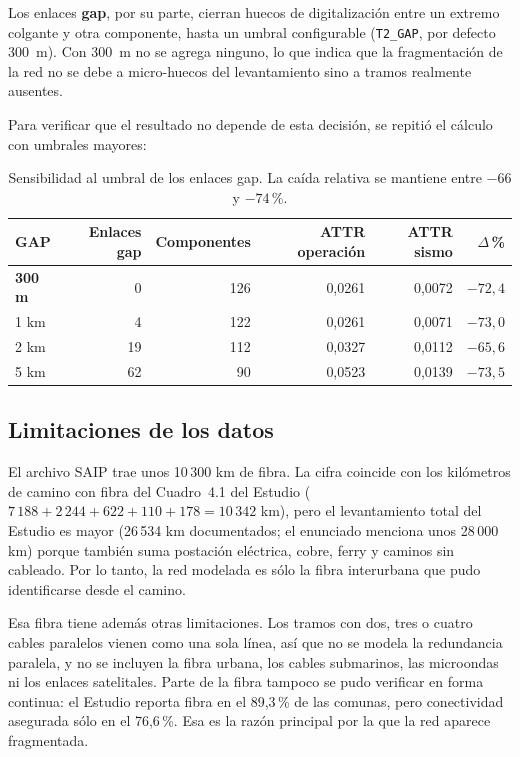 \documentclass[11pt,a4paper]{article}
\newcommand{\cod}[1]{\texttt{#1}}
\begin{document}
Los enlaces \textbf{gap}, por su parte, cierran huecos de digitalización entre un extremo colgante y
otra componente, hasta un umbral configurable (\cod{T2\_GAP}, por defecto 300~m). Con 300~m no se
agrega ninguno, lo que indica que la fragmentación de la red no se debe a micro-huecos del
levantamiento sino a tramos realmente ausentes.

Para verificar que el resultado no depende de esta decisión, se repitió el cálculo con umbrales mayores:

\begin{table}[h]
\centering
\begin{tabular}{lrrrrr}
\toprule
GAP & Enlaces gap & Componentes & ATTR operación & ATTR sismo & $\Delta$\,\% \\
\midrule
\textbf{300 m} & 0 & 126 & 0,0261 & 0,0072 & $-72{,}4$ \\
1 km & 4 & 122 & 0,0261 & 0,0071 & $-73{,}0$ \\
2 km & 19 & 112 & 0,0327 & 0,0112 & $-65{,}6$ \\
5 km & 62 & 90 & 0,0523 & 0,0139 & $-73{,}5$ \\
\bottomrule
\end{tabular}
\caption{Sensibilidad al umbral de los enlaces gap. La caída relativa se mantiene entre $-66$ y $-74$\,\%.}
\end{table}

\subsection{Limitaciones de los datos}
El archivo SAIP trae unos 10\,300 km de fibra. La cifra coincide con los kilómetros de camino con
fibra del Cuadro~4.1 del Estudio ($7\,188 + 2\,244 + 622 + 110 + 178 = 10\,342$ km), pero el
levantamiento total del Estudio es mayor (26\,534 km documentados; el enunciado menciona unos
28\,000 km) porque también suma postación eléctrica, cobre, ferry y caminos sin cableado. Por lo tanto,
la red modelada es sólo la fibra interurbana que pudo identificarse desde el camino.

Esa fibra tiene además otras limitaciones. Los tramos con dos, tres o cuatro cables paralelos vienen
como una sola línea, así que no se modela la redundancia paralela, y no se incluyen la fibra urbana,
los cables submarinos, las microondas ni los enlaces satelitales. Parte de la fibra tampoco se pudo
verificar en forma continua: el Estudio reporta fibra en el 89,3\,\% de las comunas, pero conectividad
asegurada sólo en el 76,6\,\%. Esa es la razón principal por la que la red aparece fragmentada.
\end{document}
